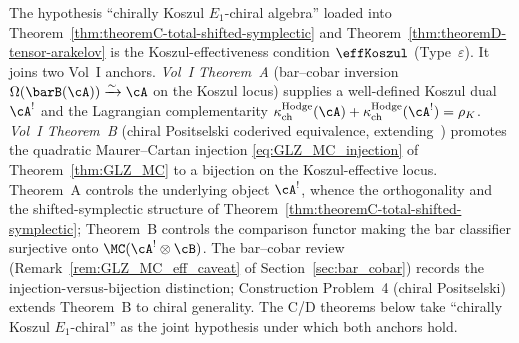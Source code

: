\begin{remark}
\label{rem:theoremC-A-vs-B-signpost}
The hypothesis ``chirally Koszul $E_1$-chiral algebra'' loaded
into Theorem~\ref{thm:theoremC-total-shifted-symplectic} and
Theorem~\ref{thm:theoremD-tensor-arakelov} is the
Koszul-effectiveness condition $\effKoszul$ (Type~$\varepsilon$).
It joins two Vol~I anchors. \emph{Vol~I Theorem~A} (bar--cobar
inversion $\Omega(\barB(\cA)) \xrightarrow{\sim} \cA$ on the
Koszul locus) supplies a well-defined Koszul dual~$\cA^!$ and the
Lagrangian complementarity
$\kappaChHodge(\cA) + \kappaChHodge(\cA^!) = \rho_K$.
\emph{Vol~I Theorem~B} (chiral Positselski coderived equivalence,
extending~\cite{Positselski11}) promotes the quadratic
Maurer--Cartan injection \eqref{eq:GLZ_MC_injection} of
Theorem~\ref{thm:GLZ_MC} to a bijection on the Koszul-effective
locus. Theorem~A controls the underlying object $\cA^!$, whence
the orthogonality and the shifted-symplectic structure of
Theorem~\ref{thm:theoremC-total-shifted-symplectic}; Theorem~B
controls the comparison functor making the bar classifier
surjective onto $\MC(\cA^! \otimes \cB)$. The bar--cobar review
(Remark~\ref{rem:GLZ_MC_eff_caveat} of
Section~\ref{sec:bar_cobar}) records the
injection-versus-bijection distinction; Construction Problem~4
(chiral Positselski) extends Theorem~B to chiral generality. The
C/D theorems below take ``chirally Koszul $E_1$-chiral'' as the
joint hypothesis under which both anchors hold.
\end{remark}

